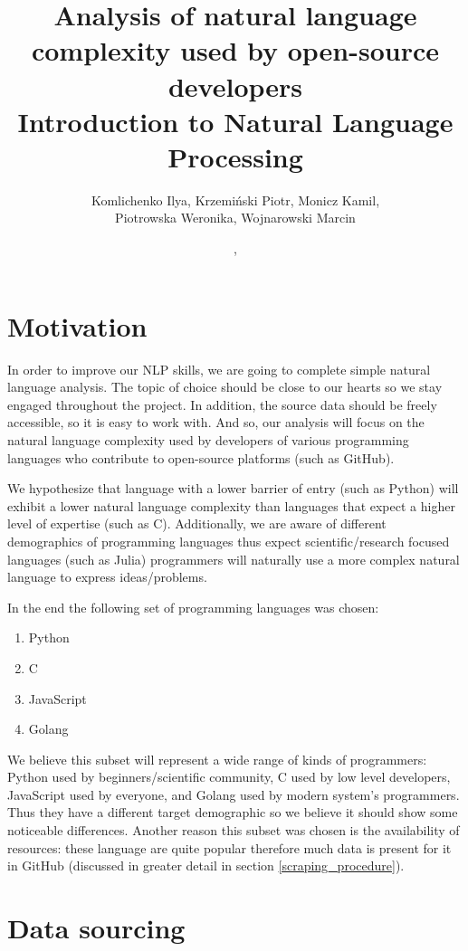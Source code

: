 \documentclass[]{article}
\title{Analysis of natural language complexity used by open-source developers\\ \large Introduction to Natural Language Processing}
\author{Komlichenko Ilya, Krzemiński Piotr, Monicz Kamil, \\Piotrowska Weronika, Wojnarowski Marcin}
\date{\monthname, \the\year}
\begin{document}
\maketitle

{\hypersetup{linkcolor=black}\tableofcontents}
\newpage


\section{Motivation}

In order to improve our NLP skills, we are going to complete simple natural language analysis. The topic of choice should be close to our hearts so we stay engaged throughout the project. In addition, the source data should be freely accessible, so it is easy to work with. And so, our analysis will focus on the natural language complexity used by developers of various programming languages who contribute to open-source platforms (such as GitHub).

We hypothesize that language with a lower barrier of entry (such as Python) will exhibit a lower natural language complexity than languages that expect a higher level of expertise (such as C). Additionally, we are aware of different demographics of programming languages thus expect scientific/research focused languages (such as Julia) programmers will naturally use a more complex natural language to express ideas/problems.

In the end the following set of programming languages was chosen:

\begin{enumerate}
    \item Python
    \item C
    \item JavaScript
    \item Golang
\end{enumerate}

We believe this subset will represent a wide range of kinds of programmers: Python used by beginners/scientific community, C used by low level developers, JavaScript used by everyone, and Golang used by modern system's programmers. Thus they have a different target demographic so we believe it should show some noticeable differences. Another reason this subset was chosen is the availability of resources: these language are quite popular therefore much data is present for it in GitHub (discussed in greater detail in section \ref{scraping_procedure}).

\section{Data sourcing}
\end{document}
